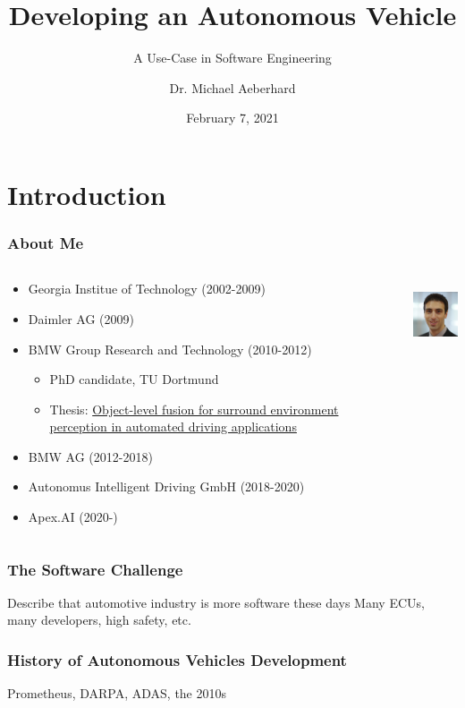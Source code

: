 \documentclass{beamer}
\title{Developing an Autonomous Vehicle}
\subtitle{A Use-Case in Software Engineering}
\author{Dr. Michael Aeberhard}
\institute{Apex.AI}
\date{February 7, 2021}
\begin{document}
\frame{\titlepage}

\section{Introduction}

\begin{frame}[t]
\frametitle{About Me}
\begin{columns}[T]
    \begin{column}{.80\textwidth}
    \begin{itemize}
        \item Georgia Institue of Technology (2002-2009)
        \item Daimler AG (2009)
        \item BMW Group Research and Technology (2010-2012)
        \begin{itemize}
            \item PhD candidate, TU Dortmund
            \item Thesis: \href{https://eldorado.tu-dortmund.de/handle/2003/36011}{Object-level fusion for surround environment perception in automated driving applications}
        \end{itemize}
        \item BMW AG (2012-2018)
        \item Autonomus Intelligent Driving GmbH (2018-2020)
        \item Apex.AI (2020-)
    \end{itemize}
    \end{column}
    \begin{column}{.20\textwidth}
    \centering
    \includegraphics[height=2.0cm]{images/michael-aeberhard-profile.jpg} \\
    \end{column}
\end{columns}
\end{frame}

\begin{frame}
\frametitle{The Software Challenge}
Describe that automotive industry is more software these days
Many ECUs, many developers, high safety, etc.
\end{frame}

\begin{frame}
\frametitle{History of Autonomous Vehicles Development}
Prometheus, DARPA, ADAS, the 2010s
\end{frame}
\end{document}
